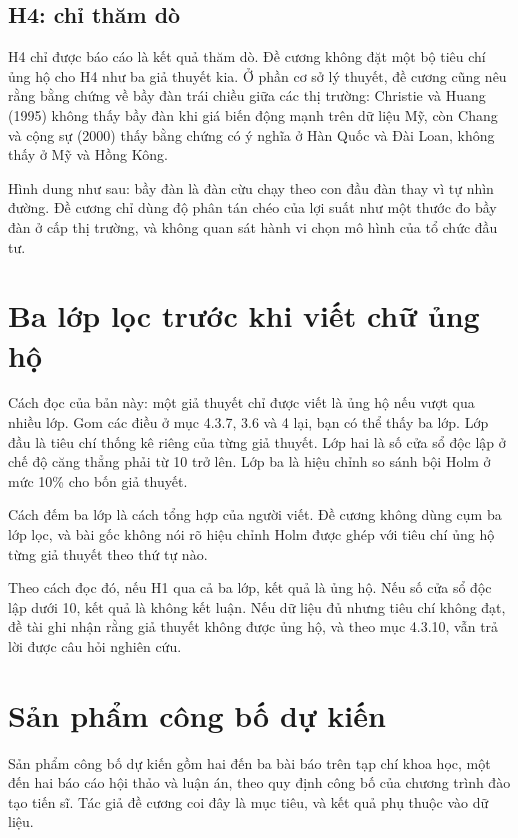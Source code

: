 \subsection{H4: chỉ thăm dò}

H4 chỉ được báo cáo là kết quả thăm dò. Đề cương không đặt một bộ tiêu chí ủng hộ cho H4 như ba giả thuyết kia. Ở phần cơ sở lý thuyết, đề cương cũng nêu rằng bằng chứng về bầy đàn trái chiều giữa các thị trường: Christie và Huang (1995) không thấy bầy đàn khi giá biến động mạnh trên dữ liệu Mỹ, còn Chang và cộng sự (2000) thấy bằng chứng có ý nghĩa ở Hàn Quốc và Đài Loan, không thấy ở Mỹ và Hồng Kông.

Hình dung như sau: bầy đàn là đàn cừu chạy theo con đầu đàn thay vì tự nhìn đường. Đề cương chỉ dùng độ phân tán chéo của lợi suất như một thước đo bầy đàn ở cấp thị trường, và không quan sát hành vi chọn mô hình của tổ chức đầu tư.

\section{Ba lớp lọc trước khi viết chữ ủng hộ}

Cách đọc của bản này: một giả thuyết chỉ được viết là ủng hộ nếu vượt qua nhiều lớp. Gom các điều ở mục 4.3.7, 3.6 và 4 lại, bạn có thể thấy ba lớp. Lớp đầu là tiêu chí thống kê riêng của từng giả thuyết. Lớp hai là số cửa sổ độc lập ở chế độ căng thẳng phải từ 10 trở lên. Lớp ba là hiệu chỉnh so sánh bội Holm ở mức 10\% cho bốn giả thuyết.

Cách đếm ba lớp là cách tổng hợp của người viết. Đề cương không dùng cụm ba lớp lọc, và bài gốc không nói rõ hiệu chỉnh Holm được ghép với tiêu chí ủng hộ từng giả thuyết theo thứ tự nào.

Theo cách đọc đó, nếu H1 qua cả ba lớp, kết quả là ủng hộ. Nếu số cửa sổ độc lập dưới 10, kết quả là không kết luận. Nếu dữ liệu đủ nhưng tiêu chí không đạt, đề tài ghi nhận rằng giả thuyết không được ủng hộ, và theo mục 4.3.10, vẫn trả lời được câu hỏi nghiên cứu.

\section{Sản phẩm công bố dự kiến}

Sản phẩm công bố dự kiến gồm hai đến ba bài báo trên tạp chí khoa học, một đến hai báo cáo hội thảo và luận án, theo quy định công bố của chương trình đào tạo tiến sĩ. Tác giả đề cương coi đây là mục tiêu, và kết quả phụ thuộc vào dữ liệu.


